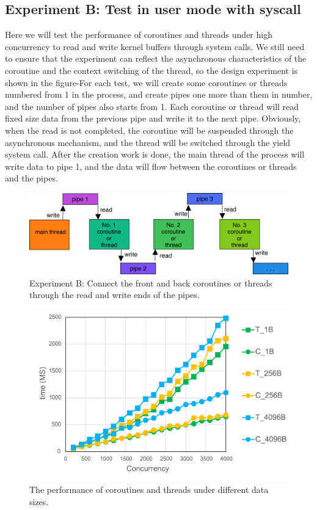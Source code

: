 \documentclass[10pt]{article}
\begin{document}
\subsection{Experiment B: Test in user mode with syscall}

Here we will test the performance of coroutines and threads under high concurrency to read and write kernel buffers through system calls. We still need to ensure that the experiment can reflect the asynchronous characteristics of the coroutine and the context switching of the thread, so the design experiment is shown in the figure-For each test, we will create some coroutines or threads numbered from 1 in the process, and create pipes one more than them in number, and the number of pipes also starts from 1. Each coroutine or thread will read fixed size data from the previous pipe and write it to the next pipe. Obviously, when the read is not completed, the coroutine will be suspended through the asynchronous mechanism, and the thread will be switched through the yield system call. After the creation work is done, the main thread of the process will write data to pipe 1, and the data will flow between the coroutines or threads and the pipes.

\begin{figure}[ht]
\begin{center}
\centerline{\includegraphics[width=\columnwidth]{expb.png}}
\caption{Experiment B: Connect the front and back coroutines or threads through the read and write ends of the pipes.}
\label{test2}
\end{center}
\end{figure}


\begin{figure}[htb]
\begin{center}
\centerline{\includegraphics[width=\columnwidth]{tc.png}}
\caption{The performance of coroutines and threads under different data sizes.}
\label{tv}
\end{center}
\end{figure}
\end{document}
